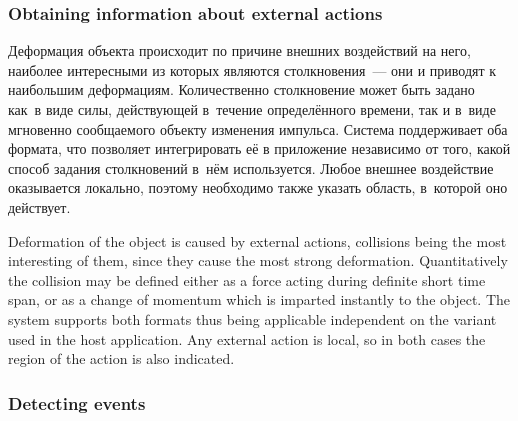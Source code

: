 \documentclass[a4paper, 12pt, titlepage]{extarticle}
\begin{document}
      \subsubsection{Obtaining information about external actions}\label{sssec:external_forces}

\begin{original}
        Деформация объекта происходит по причине внешних воздействий на него, наиболее интересными
        из которых являются столкновения~--- они и приводят к наибольшим деформациям. Количественно
        столкновение может быть задано как~в виде силы, действующей в~течение определённого времени, так и
        в~виде мгновенно сообщаемого объекту изменения импульса.
        Система поддерживает оба формата, что позволяет интегрировать её в приложение независимо от
        того, какой способ задания столкновений в~нём используется.
        Любое внешнее воздействие оказывается локально, поэтому необходимо также указать область,
        в~которой оно действует.
\end{original}

        Deformation of the object is caused by external actions, collisions being the most
        interesting of them, since they cause the most strong deformation. Quantitatively the
        collision may be defined either as a force acting during definite short time span, or as a
        change of momentum which is imparted instantly to the object. The system supports both
        formats thus being applicable independent on the variant used in the host application. Any
        external action is local, so in both cases the region of the action is also indicated.

      \subsubsection{Detecting events}\label{sssec:events}
\end{document}
